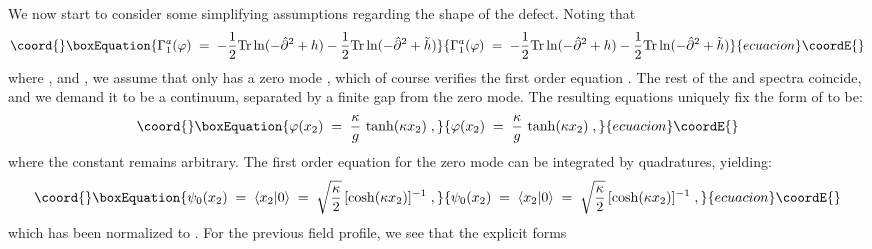 \documentclass[a4paper,12pt]{article}
\begin{document}
We now start to consider some simplifying assumptions regarding the
shape of the defect. Noting that
\begin{equation}\coord{}\boxEquation{
  \label{eq:gma12}
\Gamma_1^a(\varphi) \;=\; -\frac{1}{2} {\rm Tr} \ln ( -{\hat \partial}^2 + h )
-\frac{1}{2} {\rm Tr} \ln ( -{\hat \partial}^2 + {\tilde h} )
}{
  \Gamma_1^a(\varphi) \;=\; -\frac{1}{2} {\rm Tr} \ln ( -{\hat \partial}^2 + h )
-\frac{1}{2} {\rm Tr} \ln ( -{\hat \partial}^2 + {\tilde h} )
}{ecuacion}\coordE{}\end{equation}
where \coordHE{}, \coordHE{} and \coordHE{}, we assume that
only \coordHE{} has a zero mode \myHighlight{$|0\rangle$}\coordHE{}, which of course verifies the first
order equation \coordHE{}. The rest of the \coordHE{} and \coordHE{}
spectra coincide, and we demand it to be a continuum, separated by a
finite gap \coordHE{} from the zero mode.  The resulting equations
uniquely fix the form of \myHighlight{$\varphi$}\coordHE{} to be:
\begin{equation}\coord{}\boxEquation{
  \label{eq:tanh}
\varphi(x_2) \;=\; \frac{\kappa}{g} \, \tanh (\kappa x_2) \;,
}{
  \varphi(x_2) \;=\; \frac{\kappa}{g} \, \tanh (\kappa x_2) \;,
}{ecuacion}\coordE{}\end{equation}    
where the constant \myHighlight{$\kappa$}\coordHE{} remains arbitrary. The first order equation 
for the zero mode can be integrated by quadratures, yielding:
\begin{equation}\coord{}\boxEquation{
  \label{eq:zm}
\psi_0(x_2)\;=\; \langle x_2|0\rangle \;=\; \sqrt{\frac{\kappa}{2}} \, [\cosh(\kappa x_2)]^{-1} \;, 
}{
  \psi_0(x_2)\;=\; \langle x_2|0\rangle \;=\; \sqrt{\frac{\kappa}{2}} \, [\cosh(\kappa x_2)]^{-1} \;, 
}{ecuacion}\coordE{}\end{equation}
which has been normalized to \coordHE{}.
For the previous \myHighlight{$\varphi$}\coordHE{} field profile, we see that the explicit forms 
\end{document}

